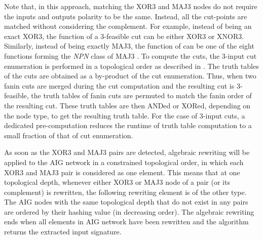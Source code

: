 Note that, in this approach, matching the XOR3 and MAJ3 nodes do not require the inputs and outputs polarity to be the same. Instead, all the cut-points are matched without considering the complement. For example, instead of being an exact XOR3, the function of a 3-feasible cut can be either XOR3 or XNOR3. Similarly, instead of being exactly MAJ3, the function of can be one of the eight functions forming the \textit{NPN} class of MAJ3 \cite{HuangWNM13}. To compute the cuts, the 3-input cut enumeration is performed in a topological order as described in \cite{PanL98}. The truth tables of the cuts are obtained as a by-product of the cut enumeration. Thus, when two fanin cuts are merged during the cut computation and the resulting cut is 3-feasible, the truth tables of fanin cuts are permuted to match the fanin order of the resulting cut. These truth tables are then ANDed or XORed, depending on the node type, to get the resulting truth table. For the case of 3-input cuts, a dedicated pre-computation reduces the runtime of truth table computation to a small fraction of that of cut enumeration.


As soon as the XOR3 and MAJ3 pairs are detected, algebraic rewriting will be applied to the AIG network in a constrained topological order, in which each XOR3 and MAJ3 pair is considered as one element. This means that at one topological depth, whenever either XOR3 or MAJ3 node of a pair (or its complement) is rewritten, the following rewriting element is of the other type. The AIG nodes with the same topological depth that do not exist in any pairs are ordered by their hashing value (in decreasing order). The algebraic rewriting ends when all elements in AIG network have been rewritten and the algorithm returns the extracted input signature. 


%




